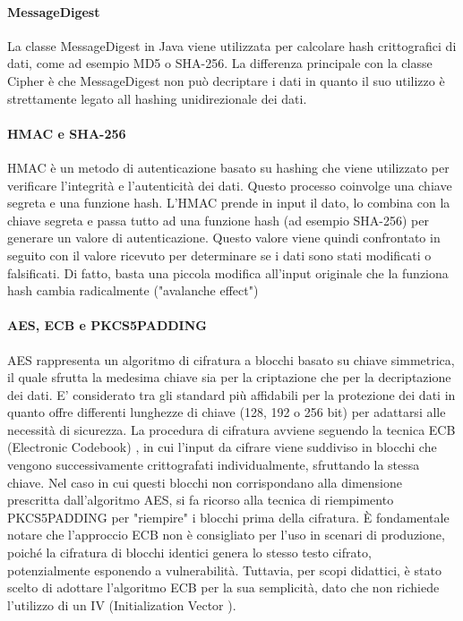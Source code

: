\paragraph{MessageDigest}
La classe MessageDigest \cite{message_digest} in Java viene utilizzata per calcolare hash \cite{hash} crittografici di dati, come ad esempio MD5 o SHA-256. La differenza principale con la classe Cipher è che MessageDigest non può decriptare i dati in quanto il suo utilizzo è strettamente legato all hashing unidirezionale dei dati.

\paragraph{HMAC e SHA-256}
HMAC \cite{hmac} è un metodo di autenticazione basato su hashing che viene utilizzato per verificare l'integrità e l'autenticità dei dati. Questo processo coinvolge una chiave segreta e una funzione hash. L'HMAC prende in input il dato, lo combina con la chiave segreta e passa tutto ad una funzione hash (ad esempio SHA-256) per generare un valore di autenticazione. Questo valore viene quindi confrontato in seguito con il valore ricevuto per determinare se i dati sono stati modificati o falsificati. Di fatto, basta una piccola modifica all'input originale che la funziona hash cambia radicalmente ("avalanche effect")

\paragraph{AES, ECB e PKCS5PADDING}
AES \cite{aes} rappresenta un algoritmo di cifratura a blocchi basato su chiave simmetrica, il quale sfrutta la medesima chiave sia per la criptazione che per la decriptazione dei dati. E' considerato tra gli standard più affidabili per la protezione dei dati in quanto offre differenti lunghezze di chiave (128, 192 o 256 bit) per adattarsi alle necessità di sicurezza.
La procedura di cifratura avviene seguendo la tecnica ECB (Electronic Codebook) \cite{ecb}, in cui l'input da cifrare viene suddiviso in blocchi che vengono successivamente crittografati individualmente, sfruttando la stessa chiave. Nel caso in cui questi blocchi non corrispondano alla dimensione prescritta dall'algoritmo AES, si fa ricorso alla tecnica di riempimento PKCS5PADDING per "riempire" i blocchi prima della cifratura.
È fondamentale notare che l'approccio ECB non è consigliato per l'uso in scenari di produzione, poiché la cifratura di blocchi identici genera lo stesso testo cifrato, potenzialmente esponendo a vulnerabilità. Tuttavia, per scopi didattici, è stato scelto di adottare l'algoritmo ECB per la sua semplicità, dato che non richiede l'utilizzo di un IV (Initialization Vector \cite{iv}).

